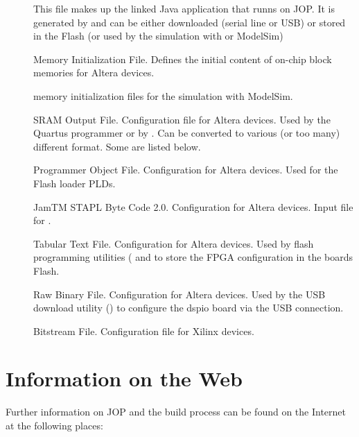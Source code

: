 \begin{description}

\item[] This file makes up the linked Java application
    that runns on JOP. It is generated by  and can
    be either downloaded (serial line or USB) or stored in the
    Flash (or used by the simulation with  or
    ModelSim)

\item[] Memory Initialization File. Defines the initial
content of on-chip block memories for Altera devices.

\item[] memory initialization files for the simulation
with ModelSim.

\item[] SRAM Output File. Configuration file for Altera
devices. Used by the Quartus programmer or by .
Can be converted to various (or too many) different format. Some are
listed below.

\item[] Programmer Object File. Configuration for Altera
devices. Used for the Flash loader PLDs.

\item[] JamTM STAPL Byte Code 2.0. Configuration for Altera
devices. Input file for .

\item[] Tabular Text File. Configuration for Altera
devices. Used by flash programming utilities ( and
 to store the FPGA configuration in the boards Flash.

\item[] Raw Binary File. Configuration for Altera
devices. Used by the USB download utility () to
configure the dspio board via the USB connection.

\item[] Bitstream File. Configuration file for Xilinx
devices.

\end{description}

\section{Information on the Web}

Further information on JOP and the build process can be found on the
Internet at the following places:

